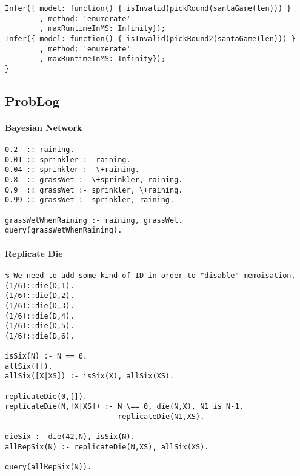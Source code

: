\begin{verbatim}
Infer({ model: function() { isInvalid(pickRound(santaGame(len))) }
        , method: 'enumerate'
        , maxRuntimeInMS: Infinity});
Infer({ model: function() { isInvalid(pickRound2(santaGame(len))) }
        , method: 'enumerate'
        , maxRuntimeInMS: Infinity});
}
\end{verbatim}

\subsection*{ProbLog}

\paragraph{Bayesian Network}

\begin{verbatim}
0.2  :: raining.
0.01 :: sprinkler :- raining.
0.04 :: sprinkler :- \+raining.
0.8  :: grassWet :- \+sprinkler, raining.
0.9  :: grassWet :- sprinkler, \+raining.
0.99 :: grassWet :- sprinkler, raining.

grassWetWhenRaining :- raining, grassWet.
query(grassWetWhenRaining).
\end{verbatim}

\paragraph{Replicate Die}
\begin{verbatim}
% We need to add some kind of ID in order to "disable" memoisation.
(1/6)::die(D,1).
(1/6)::die(D,2).
(1/6)::die(D,3).
(1/6)::die(D,4).
(1/6)::die(D,5).
(1/6)::die(D,6).

isSix(N) :- N == 6.
allSix([]).
allSix([X|XS]) :- isSix(X), allSix(XS).

replicateDie(0,[]).
replicateDie(N,[X|XS]) :- N \== 0, die(N,X), N1 is N-1,
                          replicateDie(N1,XS).

dieSix :- die(42,N), isSix(N).
allRepSix(N) :- replicateDie(N,XS), allSix(XS).

query(allRepSix(N)).
\end{verbatim}

